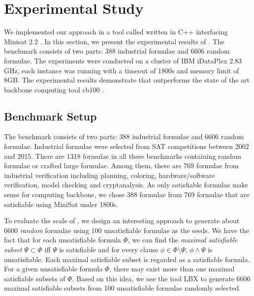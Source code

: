 \section{Experimental Study}\label{sec:expr}
We implemented our approach in a tool called \tool written in C++ interfacing Minisat 2.2 \cite{MINISAT}. %
In this section, we present the experimental results of \tool.
The benchmark consists of two parts: 388 industrial formulae and 6606 random formulae.
The experiments were conducted on a cluster of IBM iDataPlex 2.83 GHz, each instance was running with a timeout of 1800s and memory limit of 8GB.
The experimental results demonstrate that \tool outperforms the state of the art backbone computing tool
cb100 \cite{JLM15}.

\subsection{Benchmark Setup}
The benchmark consists of two parts: 388 industrial formulae and 6606 random formulae.
Industrial formulae were selected from SAT competitions between 2002 and 2015.
There are 1318 formulae in all these benchmarks containing random formulae or crafted large formulae.
Among them, there are 769 formulae from industrial verification including planning, coloring, hardware/software verification, model checking and cryptanalysis.
As only satisfiable formulae make sense for computing backbone, we chose 388 formulae from 769 formulae that are satisfiable using MiniSat under 1800s.


To evaluate the scale  of \tool, we design an interesting approach to generate about 6600 \textit{random} formulae using 100 unsatisfiable formulae as the seeds. We have the fact that for each unsatisfiable formula $\Phi$, we can find the \textit{maximal satisfiable subset} $\Psi\subset \Phi$
iff $\Psi$ is satisfiable and for every clause $\phi\in\Phi\setminus \Psi$, $\phi\wedge \Psi$ is unsatisfiable.
Each maximal satisfiable subset is regarded as a satisfiable formula.
For a given unsatisfiable formula $\Phi$, there may exist more than one maximal satisfiable subsets of $\Phi$. Based on this idea, we use the tool LBX \cite{MPA2015} to generate 6606 maximal satisfiable subsets from 100 unsatisfiable formulae randomly selected.







